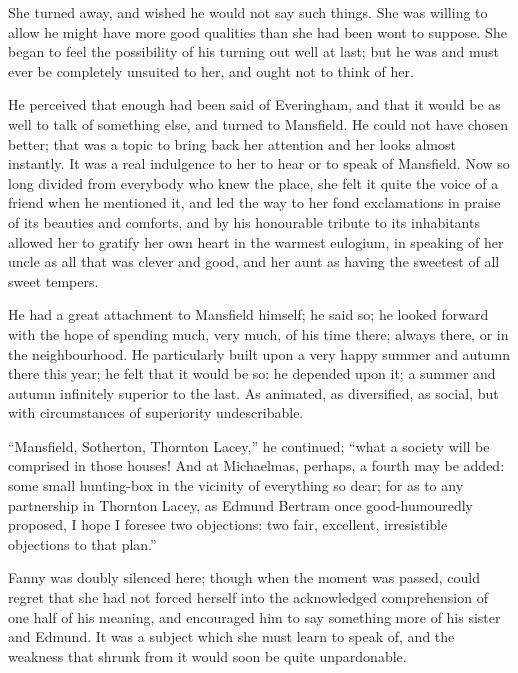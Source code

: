 She turned away, and wished he would not say such things.
She was willing to allow he might have more good
qualities than she had been wont to suppose.  She began
to feel the possibility of his turning out well at last;
but he was and must ever be completely unsuited to her,
and ought not to think of her.

He perceived that enough had been said of Everingham,
and that it would be as well to talk of something else,
and turned to Mansfield.  He could not have chosen better;
that was a topic to bring back her attention and her looks
almost instantly.  It was a real indulgence to her to hear
or to speak of Mansfield.  Now so long divided from
everybody who knew the place, she felt it quite the voice
of a friend when he mentioned it, and led the way to her
fond exclamations in praise of its beauties and comforts,
and by his honourable tribute to its inhabitants allowed
her to gratify her own heart in the warmest eulogium,
in speaking of her uncle as all that was clever and good,
and her aunt as having the sweetest of all sweet tempers.

He had a great attachment to Mansfield himself; he said so;
he looked forward with the hope of spending much, very much,
of his time there; always there, or in the neighbourhood.
He particularly built upon a very happy summer and
autumn there this year; he felt that it would be so:
he depended upon it; a summer and autumn infinitely superior
to the last.  As animated, as diversified, as social,
but with circumstances of superiority undescribable.

``Mansfield, Sotherton, Thornton Lacey,'' he continued;
``what a society will be comprised in those houses!
And at Michaelmas, perhaps, a fourth may be added:
some small hunting-box in the vicinity of everything so dear;
for as to any partnership in Thornton Lacey, as Edmund
Bertram once good-humouredly proposed, I hope I foresee
two objections:  two fair, excellent, irresistible objections
to that plan.''

Fanny was doubly silenced here; though when the moment
was passed, could regret that she had not forced herself into
the acknowledged comprehension of one half of his meaning,
and encouraged him to say something more of his sister
and Edmund.  It was a subject which she must learn to speak of,
and the weakness that shrunk from it would soon be quite
unpardonable.

